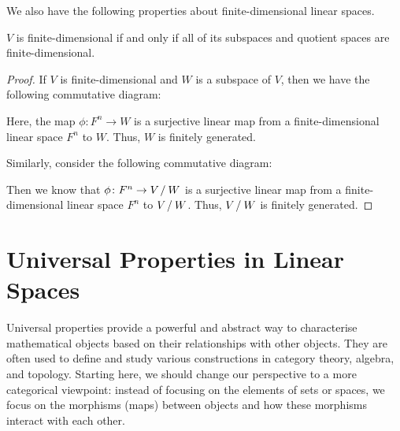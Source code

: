 We also have the following properties about finite-dimensional linear spaces.
\begin{proposition}
  $V$ is finite-dimensional if and only if all of its subspaces and quotient spaces are finite-dimensional.
\end{proposition}
\begin{proof}
  If $V$ is finite-dimensional and $W$ is a subspace of $V$, then we have the following commutative diagram:
  \begin{center}
  \end{center}
  Here, the map $\phi \colon F^n \to W$ is a surjective linear map from a finite-dimensional linear space $F^n$ to $W$. Thus, $W$ is finitely generated.

  Similarly, consider the following commutative diagram:
  \begin{center}
  \end{center}
  Then we know that $\phi \colon F^n \to V \mathbin{/} W$ is a surjective linear map from a finite-dimensional linear space $F^n$ to $V \mathbin{/} W$. Thus, $V \mathbin{/} W$ is finitely generated.
\end{proof}

\section{Universal Properties in Linear Spaces}

Universal properties provide a powerful and abstract way to characterise mathematical objects based on their relationships with other objects. They are often used to define and study various constructions in category theory, algebra, and topology. Starting here, we should change our perspective to a more categorical viewpoint: instead of focusing on the elements of sets or spaces, we focus on the morphisms (maps) between objects and how these morphisms interact with each other.

